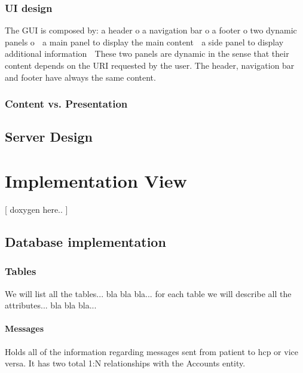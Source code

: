 \documentclass[12pt]{report}
\begin{document}
\subsection{UI design}
The GUI is composed by:
    a header
  o
    a navigation bar
  o
    a footer
  o
    two dynamic panels
  o
        a main panel to display the main content
        a side panel to display additional information
        These two panels are dynamic in the sense that their content depends on
           the URI requested by the user. The header, navigation bar and footer have
           always the same content.


\subsection{Content vs. Presentation}

\section{Server Design}



\chapter{Implementation View}
[ doxygen here.. ]

\section{Database implementation}
\subsection{Tables}
We will list all the tables... bla bla bla... for each table we will describe all the attributes... bla bla bla...

\subsubsection{Messages}
Holds all of the information regarding messages sent from patient to hcp or vice versa. It has two total 1:N relationships with the Accounts entity.
\end{document}
